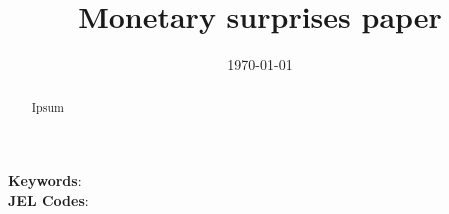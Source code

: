 
\title{Monetary surprises paper}


\date{\today}
\maketitle

\begin{abstract}

Ipsum

\end{abstract}

\noindent\textbf{Keywords}: 
\\
\textbf{JEL Codes}: 
\newpage